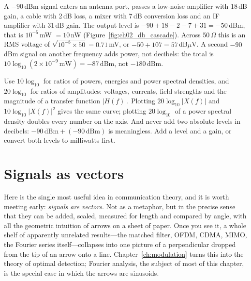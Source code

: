 \begin{worked}
A $-90$\,dBm signal enters an antenna port, passes a low-noise amplifier with 18\,dB gain, a
cable with 2\,dB loss, a mixer with 7\,dB conversion loss and an IF amplifier with 31\,dB
gain. The output level is $-90+18-2-7+31=-50$\,dBm, that is $10^{-5}$\,mW $=10$\,nW
(Figure~\ref{fig:ch02_db_cascade}). Across 50\,$\Omega$ this is an RMS voltage of
$\sqrt{10^{-8}\times50}=0.71$\,mV, or $-50+107=57$\,dB$\mu$V. A second $-90$\,dBm signal on another
frequency adds power, not decibels: the total is $10\log_{10}(2\times10^{-9}\,\text{mW})=-87$\,dBm,
not $-180$\,dBm.
\end{worked}


\begin{pitfall}
Use $10\log_{10}$ for ratios of powers, energies and power spectral densities, and
$20\log_{10}$ for ratios of amplitudes: voltages, currents, field strengths and the magnitude of a
transfer function $|H(f)|$. Plotting $20\log_{10}|X(f)|$ and $10\log_{10}|X(f)|^2$ gives the same
curve; plotting $20\log_{10}$ of a power spectral density doubles every number on the axis.
And never add two absolute levels in decibels: $-90\,\text{dBm}+(-90\,\text{dBm})$ is meaningless.
Add a level and a gain, or convert both levels to milliwatts first.
\end{pitfall}

\section{Signals as vectors}
\label{sec:ch02:vectors}

Here is the single most useful idea in communication theory, and it is worth meeting early:
\emph{signals are vectors}. Not as a metaphor, but in the precise sense that they can be added,
scaled, measured for length and compared by angle, with all the geometric intuition of arrows on a
sheet of paper. Once you see it, a whole shelf of apparently unrelated results---the matched filter,
OFDM, CDMA, MIMO, the Fourier series itself---collapses into one picture of a perpendicular dropped
from the tip of an arrow onto a line. Chapter~\ref{ch:modulation} turns this into the theory of
optimal detection; Fourier analysis, the subject of most of this chapter, is the special case in
which the arrows are sinusoids.

